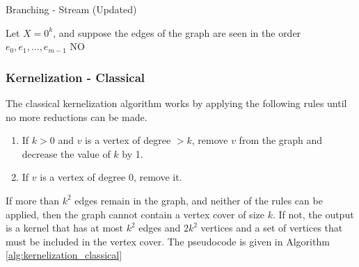 \begin{algorithm}[htb]
    \caption{Branching - Stream (Updated)}
    \label{alg:branching_stream}
    \DontPrintSemicolon


    Let $X = 0^k$, and suppose the edges of the graph are seen in the order $e_0, e_1, \dots, e_{m-1}$\;
    \Return NO
\end{algorithm}

\subsubsection{Kernelization - Classical}

The classical kernelization algorithm works by applying the following rules
until no more reductions can be made.

\begin{enumerate}
    \item
          If \(k > 0\) and \(v\) is a vertex of degree \(> k\), remove \(v\)
          from the graph and decrease the value of \(k\) by 1.
    \item
          If \(v\) is a vertex of degree 0, remove it.
\end{enumerate}

If more than \(k^2\) edges remain in the graph, and neither of the rules can be
applied, then the graph cannot contain a vertex cover of size \(k\). If not,
the output is a kernel that has at most \(k^2\) edges and \(2k^2\) vertices and
a set of vertices that must be included in the vertex cover. The pseudocode is
given in Algorithm \ref{alg:kernelization_classical}

